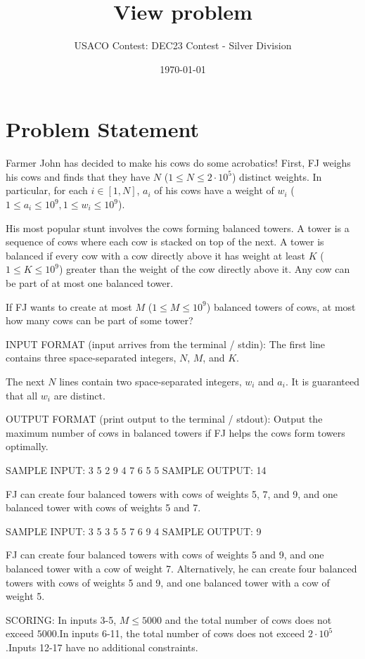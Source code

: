 \documentclass[12pt]{article}
\title{View problem}
\author{USACO Contest: DEC23 Contest - Silver Division}
\date{\today}
\begin{document}
\maketitle

\section*{Problem Statement}


Farmer John has decided to make his cows do some acrobatics! First,  FJ weighs
his cows and finds that they have $N$ ($1\le N\le 2\cdot 10^5$) distinct
weights. In particular, for each $i\in [1,N]$, $a_i$ of his cows have a weight
of $w_i$
($1\le a_i\le 10^9, 1\le w_i\le 10^9$).

His most popular stunt involves the cows forming balanced towers. A
tower is a sequence of cows where each cow is stacked on top of the next.
A tower is balanced if every cow with a cow directly above it has weight
at least $K$ ($1\le K\le 10^9$) greater than the weight of the cow directly
above it. Any cow can be part of at most one balanced tower.

If FJ wants to create at most $M$ ($1 \le M \le 10^9$) balanced towers of cows, at most
how many cows can be part of some tower?

INPUT FORMAT (input arrives from the terminal / stdin):
The first line contains three space-separated integers, $N$, $M$, and $K$.

The next $N$ lines contain two space-separated integers, $w_{i}$ and $a_i$. It
is guaranteed that all $w_i$ are distinct.

OUTPUT FORMAT (print output to the terminal / stdout):
Output the maximum number of cows in balanced towers if FJ helps the cows form towers
optimally.

SAMPLE INPUT:
3 5 2
9 4
7 6
5 5
SAMPLE OUTPUT: 
14

FJ can create four balanced towers with cows of weights 5, 7, and 9, and one balanced tower with
cows of weights 5 and 7.

SAMPLE INPUT:
3 5 3
5 5
7 6
9 4
SAMPLE OUTPUT: 
9

FJ can create four balanced towers with cows of weights 5 and 9, and one balanced tower with a cow
of weight 7. Alternatively, he can create four balanced towers with cows of weights 5 and
9, and one balanced tower with a cow of weight 5.

SCORING:
In inputs 3-5, $M \leq 5000$ and the total number of cows does not exceed
$5000$.In inputs 6-11, the total number of cows does not exceed $2\cdot 10^5$.Inputs 12-17 have no additional constraints.
\end{document}

